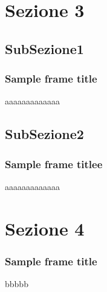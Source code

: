 \section{Sezione 3}
\subsection{SubSezione1}
\begin{frame}
    \frametitle{Sample frame title}
    aaaaaaaaaaaaa
\end{frame}

\subsection{SubSezione2}
\begin{frame}
    \frametitle{Sample frame titlee}
    aaaaaaaaaaaaa
\end{frame}

\section{Sezione 4}
\begin{frame}
    \frametitle{Sample frame title}
    bbbbb
\end{frame}
